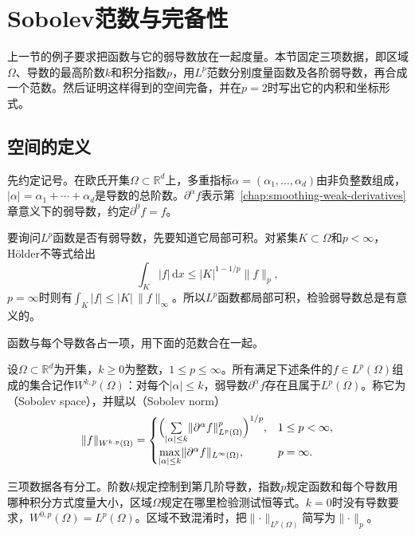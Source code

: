 \section{Sobolev范数与完备性}
\label{sec:sobolev-norms-completeness}

上一节的例子要求把函数与它的弱导数放在一起度量。本节固定三项数据，即区域$\Omega$、导数的最高阶数$k$和积分指数$p$，用$L^p$范数分别度量函数及各阶弱导数，再合成一个范数。然后证明这样得到的空间完备，并在$p=2$时写出它的内积和坐标形式。

\subsection{空间的定义}
\label{sec:sobolev-space-definition}

先约定记号。在欧氏开集$\Omega\subset\mathbb R^d$上，多重指标$\alpha=(\alpha_1,\ldots,\alpha_d)$由非负整数组成，$|\alpha|=\alpha_1+\cdots+\alpha_d$是导数的总阶数。$\partial^\alpha f$表示第~\ref{chap:smoothing-weak-derivatives}章意义下的弱导数，约定$\partial^0f=f$。

要询问$L^p$函数是否有弱导数，先要知道它局部可积。对紧集$K\subset\Omega$和$p<\infty$，Hölder不等式给出
\[
\int_K|f|\,\mathrm dx\leq|K|^{1-1/p}\lVert f\rVert_p,
\]
$p=\infty$时则有$\int_K|f|\leq|K|\,\lVert f\rVert_\infty$。所以$L^p$函数都局部可积，检验弱导数总是有意义的。

函数与每个导数各占一项，用下面的范数合在一起。

\begin{definition}[Sobolev空间]
\label{def:sobolev-space}
设$\Omega\subset\mathbb R^d$为开集，$k\geq0$为整数，$1\leq p\leq\infty$。所有满足下述条件的$f\in L^p(\Omega)$组成的集合记作$W^{k,p}(\Omega)$：对每个$|\alpha|\leq k$，弱导数$\partial^\alpha f$存在且属于$L^p(\Omega)$。称它为（Sobolev space），并赋以（Sobolev norm）
\begin{equation}
\lVert f\rVert_{W^{k,p}(\Omega)}=
\begin{cases}
\Bigl(\sum\limits_{|\alpha|\leq k}\lVert\partial^\alpha f\rVert_{L^p(\Omega)}^p\Bigr)^{1/p}, & 1\leq p<\infty,\\
\max\limits_{|\alpha|\leq k}\lVert\partial^\alpha f\rVert_{L^\infty(\Omega)}, & p=\infty .
\end{cases}
\label{eq:sobolev-norm}
\end{equation}
\end{definition}

三项数据各有分工。阶数$k$规定控制到第几阶导数，指数$p$规定函数和每个导数用哪种积分方式度量大小，区域$\Omega$规定在哪里检验测试恒等式。$k=0$时没有导数要求，$W^{0,p}(\Omega)=L^p(\Omega)$。区域不致混淆时，把$\lVert\cdot\rVert_{L^p(\Omega)}$简写为$\lVert\cdot\rVert_p$。


